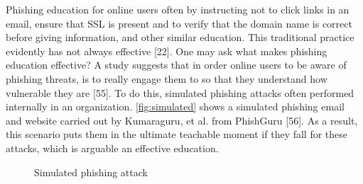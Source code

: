 Phishing education for online users often by instructing not to click
links in an email, ensure that SSL is present and to verify that the
domain name is correct before giving information, and other similar
education. This traditional practice evidently has not always effective
{[}22{]}. One may ask what makes phishing education effective? A study
suggests that in order online users to be aware of phishing threats,
is to really engage them to so that they understand how vulnerable
they are {[}55{]}. To do this, simulated phishing attacks often performed
internally in an organization. \autoref{fig:simulated} shows a simulated
phishing email and website carried out by Kumaraguru, et al. from
PhishGuru {[}56{]}. As a result, this scenario puts them in the ultimate
teachable moment if they fall for these attacks, which is arguable
an effective education. 

\begin{figure}



\quad{}\quad{}\protect\caption{\label{fig:simulated}Simulated phishing attack}


\end{figure}


